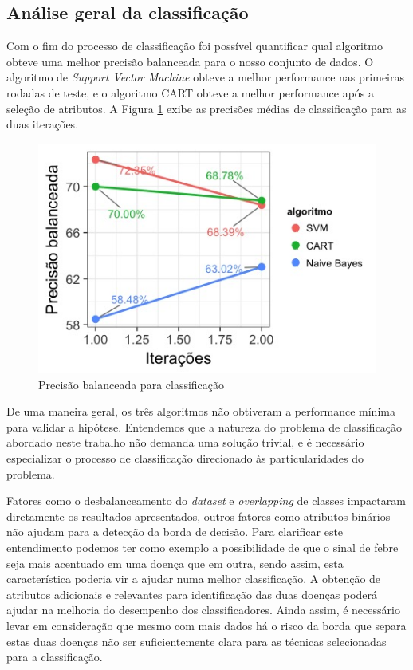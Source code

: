 \subsection{Análise geral da classificação}

Com o fim do processo de classificação foi possível quantificar qual algoritmo obteve uma melhor precisão balanceada para o nosso conjunto de dados. O algoritmo de \textit{Support Vector Machine} obteve a melhor performance nas primeiras rodadas de teste, e o algoritmo CART obteve a melhor performance após a seleção de atributos. A Figura \ref{fig:precisoesbalanceadas} exibe as precisões médias de classificação para as duas iterações.

\begin{figure}[htb]
  \caption{\label{fig:precisoesbalanceadas}Precisão balanceada para classificação}
  \begin{center}
    \includegraphics[scale=0.7]{imagens/atributos_selecao_desempenho_linhas.jpeg}
  \end{center}
\end{figure}

De uma maneira geral, os três algoritmos não obtiveram a performance mínima para validar a hipótese. Entendemos que a natureza do problema de classificação abordado neste trabalho não demanda uma solução trivial, e é necessário especializar o processo de classificação direcionado às particularidades do problema.

Fatores como o desbalanceamento do \textit{dataset} e \textit{overlapping} de classes impactaram diretamente os resultados apresentados, outros fatores como atributos binários não ajudam para a detecção da borda de decisão. Para clarificar este entendimento podemos ter como exemplo a possibilidade de que o sinal de febre seja mais acentuado em uma doença que em outra, sendo assim, esta característica poderia vir a ajudar numa melhor classificação. A obtenção de atributos adicionais e relevantes para identificação  das  duas doenças poderá ajudar na melhoria do desempenho  dos classificadores. Ainda assim, é necessário levar em consideração que mesmo com mais dados há o risco da borda que separa estas duas doenças não ser suficientemente clara para as técnicas selecionadas para a classificação.

